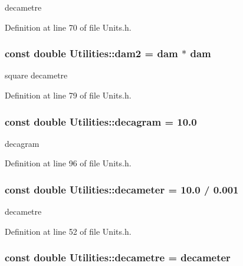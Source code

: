 decametre 



Definition at line 70 of file Units.h.

\hypertarget{namespace_utilities_ab44794b92b08edcb68141cc381801bfc}{
\subsubsection[{dam2}]{\setlength{\rightskip}{0pt plus 5cm}const double {\bf Utilities::dam2} = {\bf dam} $\ast$ {\bf dam}}}
\label{namespace_utilities_ab44794b92b08edcb68141cc381801bfc}


square decametre 



Definition at line 79 of file Units.h.

\hypertarget{namespace_utilities_a0768cb48610ba03979360e95959f44d9}{
\subsubsection[{decagram}]{\setlength{\rightskip}{0pt plus 5cm}const double {\bf Utilities::decagram} = 10.0}}
\label{namespace_utilities_a0768cb48610ba03979360e95959f44d9}


decagram 



Definition at line 96 of file Units.h.

\hypertarget{namespace_utilities_a66e92dbad293594bf063d31aa9305983}{
\subsubsection[{decameter}]{\setlength{\rightskip}{0pt plus 5cm}const double {\bf Utilities::decameter} = 10.0 / 0.001}}
\label{namespace_utilities_a66e92dbad293594bf063d31aa9305983}


decametre 



Definition at line 52 of file Units.h.

\hypertarget{namespace_utilities_ae6f96b1086168f4287845866c4a8a546}{
\subsubsection[{decametre}]{\setlength{\rightskip}{0pt plus 5cm}const double {\bf Utilities::decametre} = {\bf decameter}}}
\label{namespace_utilities_ae6f96b1086168f4287845866c4a8a546}


